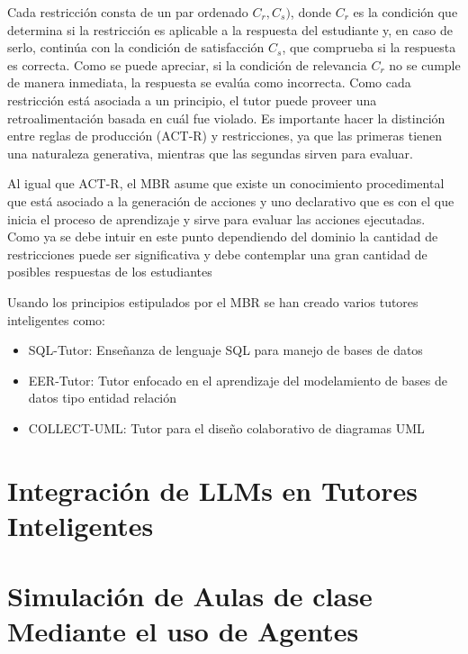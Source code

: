 Cada restricción consta de un par ordenado $C_r, C_s)$, donde $C_r$ es la condición que determina si la restricción es aplicable a la respuesta del estudiante y, en caso de serlo, continúa con la condición de satisfacción $C_s$, que comprueba si la respuesta es correcta. Como se puede apreciar, si la condición de relevancia $C_r$ no se cumple de manera inmediata, la respuesta se evalúa como incorrecta. Como cada restricción está asociada a un principio, el tutor puede proveer una retroalimentación basada en cuál fue violado. Es importante hacer la distinción entre reglas de producción (ACT-R) y restricciones, ya que las primeras tienen una naturaleza generativa, mientras que las segundas sirven para evaluar.

Al igual que ACT-R, el MBR asume que existe un conocimiento procedimental que está asociado a la generación de acciones y uno declarativo que es con el que inicia el proceso de aprendizaje y sirve para evaluar las acciones ejecutadas. Como ya se debe intuir en este punto dependiendo del dominio la cantidad de restricciones puede ser significativa y debe contemplar una gran cantidad de posibles respuestas de los estudiantes 

Usando los principios estipulados por el MBR se han creado varios tutores inteligentes como:

\begin{itemize}
  \item SQL-Tutor: Enseñanza de lenguaje SQL para manejo de bases de datos
  \item EER-Tutor: Tutor enfocado en el aprendizaje del modelamiento de bases de datos tipo entidad relación
  \item COLLECT-UML: Tutor para el diseño colaborativo de diagramas UML
\end{itemize}

\section{Integración de LLMs en Tutores Inteligentes}

\section{Simulación de Aulas de clase Mediante el uso de Agentes}
